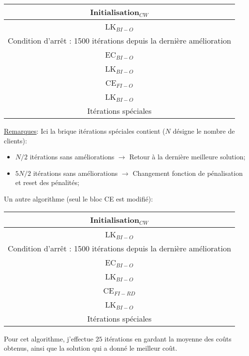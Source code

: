 \documentclass[a4paper,11pt]{article}%
\begin{document}
\begin{center}
\begin{tabular}{|c|}

   \hline
   Initialisation$_{CW}$  \\
   \hline
   LK$_{BI-O}$ \\
   \hline
   \hline
   Condition d'arrêt : 1500 itérations depuis la dernière amélioration  \\
   \hline
   EC$_{BI-O}$ \\
   \hline
   LK$_{BI-O}$ \\
   \hline
   CE$_{FI-O}$ \\
   \hline
   LK$_{BI-O}$ \\
   \hline
   Itérations spéciales \\
   \hline
   \hline
   
\end{tabular}
\end{center}

\underline{Remarques}: Ici la brique itérations spéciales contient ($N$ désigne le nombre de clients):
\begin{itemize}
\item $N/2$ itérations sans améliorations $\rightarrow$ Retour à la dernière meilleure solution;
\item $5N/2$ itérations sans améliorations $\rightarrow$ Changement fonction de pénalisation et reset des pénalités;
\end{itemize} 


Un autre algorithme (seul le bloc CE est modifié):
\begin{center}
\begin{tabular}{|c|}

   \hline
   Initialisation$_{CW}$  \\
   \hline
   LK$_{BI-O}$ \\
   \hline
   \hline
   Condition d'arrêt : 1500 itérations depuis la dernière amélioration  \\
   \hline
   EC$_{BI-O}$ \\
   \hline
   LK$_{BI-O}$ \\
   \hline
   CE$_{FI-RD}$ \\
   \hline
   LK$_{BI-O}$ \\
   \hline
   Itérations spéciales \\
   \hline
   \hline
   
\end{tabular}
\end{center}

Pour cet algorithme, j'effectue $25$ itérations en gardant la moyenne des coûts obtenus, ainsi que la solution qui a donné le meilleur coût.
\end{document}
